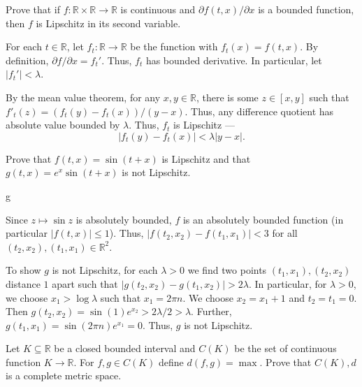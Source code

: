 \documentclass[12 pt, letterpaper]{hmcpset}
\begin{document}
\begin{problem}[1.]
	Prove that if $f : \mathbb{R} \times \mathbb{R} \to \mathbb{R}$ is continuous and $\partial f(t, x) / \partial x$ is a bounded function, then $f$ is Lipschitz in its second variable.
\end{problem}

\begin{solution}
	For each $t \in \mathbb{R}$, let $f_{t} : \mathbb{R} \to \mathbb{R}$ be the function with  $f_{t}(x) = f(t, x)$. By definition, ${\partial f}/{\partial x} = f_{t}'$. Thus, $f_{t}$ has bounded derivative. In particular, let $\lvert f_{t}' \rvert < \lambda$.

	By the mean value theorem, for any $x, y \in \mathbb{R}$, there is some $z \in [x, y]$ such that $f'_{t}(z) = ( f_{t}(y) - f_{t}(x) ) / ( y - x )$. Thus, any difference quotient has absolute value bounded by $\lambda$. Thus, $f_{t}$ is Lipschitz ---
	\[
		\lvert f_{t}(y) - f_{t}(x) \rvert < \lambda \lvert y - x \rvert.
	\]

\end{solution}

\pagebreak

\begin{problem}[2.]
	Prove that $f(t, x) = \sin{(t + x)}$ is Lipschitz and that $g(t, x) = e^{x} \sin{(t + x)}$ is not Lipschitz.
\end{problem}g

\begin{solution}
	Since $z \mapsto \sin{z}$ is absolutely bounded, $f$ is an absolutely bounded function (in particular $\lvert f(t, x) \rvert \le 1$). Thus, $\lvert f(t_{2}, x_{2}) - f(t_{1}, x_{1}) \rvert < 3$ for all $(t_{2}, x_{2}), (t_{1}, x_{1}) \in \mathbb{R}^{2}$.

	To show $g$ is not Lipschitz, for each  $\lambda > 0$ we find two points $(t_{1}, x_{1}), (t_{2}, x_{2})$ distance $1$ apart such that $\lvert g(t_{2}, x_{2}) - g(t_{1}, x_{2}) \rvert > 2 \lambda$. In particular, for $\lambda > 0$, we choose $x_{1} > \log \lambda$ such that $x_{1} = 2 \pi n$. We choose $x_{2} = x_{1} + 1$ and $t_{2} = t_{1} = 0$. Then $g(t_{2}, x_{2}) = \sin{(1)} e^{x_{2}} > 2 \lambda / 2 > \lambda$. Further, $g(t_{1}, x_{1}) = \sin{(2 \pi n)} e^{x_{1}} = 0$. Thus, $g$ is not Lipschitz.
\end{solution}

\pagebreak

\begin{problem}[3.]
	Let $K \subseteq \mathbb{R}$ be a closed bounded interval and $C(K)$ be the set of continuous function $K \to \mathbb{R}$. For $f, g \in C(K)$ define $d(f, g) = \max$. Prove that $C(K), d$ is a complete metric space.
\end{problem}
\end{document}
